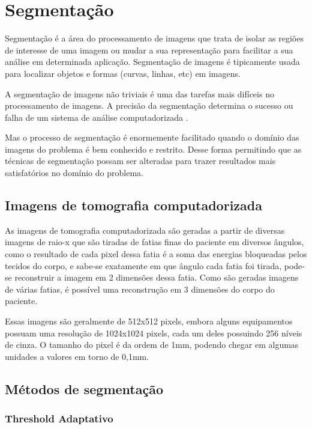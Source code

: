 \chapter{Segmentação}

Segmentação é a área do processamento de imagens que trata de isolar as regiões de interesse de uma imagem ou mudar a sua representação para facilitar a sua análise em determinada aplicação. Segmentação de imagens é tipicamente usada para localizar objetos e formas (curvas, linhas, etc) em imagens.

A segmentação de imagens não triviais é uma das tarefas mais difíceis no processamento de imagens. A precisão da segmentação determina o sucesso ou falha de um sistema de análise computadorizada \cite{gonzalez}.

Mas o processo de segmentação é enormemente facilitado quando o domínio das imagens do problema é bem conhecido e restrito. Desse forma permitindo que as técnicas de segmentação possam ser alteradas para trazer resultados mais satisfatórios no domínio do problema.

\section{Imagens de tomografia computadorizada}

As imagens de tomografia computadorizada são geradas a partir de diversas imagens de raio-x que são tiradas de fatias finas do paciente em diversos ângulos, como o resultado de cada pixel dessa fatia é a soma das energias bloqueadas pelos tecidos do corpo, e sabe-se exatamente em que ângulo cada fatia foi tirada, pode-se reconstruir a imagem em 2 dimensões dessa fatia. Como são geradas imagens de várias fatias, é possível uma reconstrução em 3 dimensões do corpo do paciente.

Essas imagens são geralmente de 512x512 pixels, embora alguns equipamentos possuam uma resolução de 1024x1024 pixels, cada um deles possuindo 256 níveis de cinza. O tamanho do pixel é da ordem de 1mm, podendo chegar em algumas unidades a valores em torno de 0,1mm.


\section{Métodos de segmentação}



\subsection{Threshold Adaptativo}



